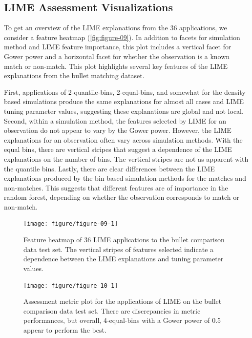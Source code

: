 \documentclass[AMS,STIX2COL]{WileyNJD-v2}\usepackage[]{graphicx}\usepackage[]{color}
\newenvironment{knitrout}{}{} %
\begin{document}
\subsection{LIME Assessment Visualizations} \label{bullet-assess-ex}

To get an overview of the LIME explanations from the 36 applications, we consider a feature heatmap (\autoref{fig:figure-09}). In addition to facets for simulation method and LIME feature importance, this plot includes a vertical facet for Gower power and a horizontal facet for whether the observation is a known match or non-match. This plot highlights several key features of the LIME explanations from the bullet matching dataset.

First, applications of 2-quantile-bins, 2-equal-bins, and somewhat for the density based simulations produce the same explanations for almost all cases and LIME tuning parameter values, suggesting these explanations are global and not local. Second, within a simulation method, the features selected by LIME for an observation do not appear to vary by the Gower power. However, the LIME explanations for an observation often vary across simulation methods. With the equal bins, there are vertical stripes that suggest a dependence of the LIME explanations on the number of bins. The vertical stripes are not as apparent with the quantile bins. Lastly, there are clear differences between the LIME explanations produced by the bin based simulation methods for the matches and non-matches. This suggests that different features are of importance in the random forest, depending on whether the observation corresponds to match or non-match.

\begin{figure}[!thp]
\begin{knitrout}
\color{fgcolor}

{\centering \texttt{[image: figure/figure-09-1]} 

}



\end{knitrout}
\caption{Feature heatmap of 36 LIME applications to the bullet comparison data test set. The vertical stripes of features selected indicate a dependence between the LIME explanations and tuning parameter values.}
\label{fig:figure-09}

\vspace*{\floatsep}

\begin{knitrout}
\color{fgcolor}

{\centering \texttt{[image: figure/figure-10-1]} 

}



\end{knitrout}
\caption{Assessment metric plot for the applications of LIME on the bullet comparison data test set. There are discrepancies in metric performances, but overall, 4-equal-bins with a Gower power of 0.5 appear to perform the best.}
\label{fig:figure-10}
\end{figure}
\end{document}
